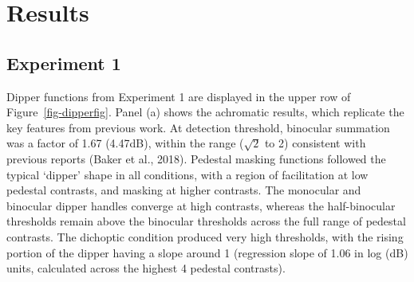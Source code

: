 \documentclass[
  letterpaper,
  DIV=11,
  numbers=noendperiod]{scrartcl}
\begin{document}
\section{Results}\label{results}

\subsection{Experiment 1}\label{experiment-1}

Dipper functions from Experiment 1 are displayed in the upper row of
Figure~\ref{fig-dipperfig}. Panel (a) shows the achromatic results,
which replicate the key features from previous work. At detection
threshold, binocular summation was a factor of 1.67 (4.47dB), within the
range (\(\sqrt{2}\) to 2) consistent with previous reports (Baker et
al., 2018). Pedestal masking functions followed the typical `dipper'
shape in all conditions, with a region of facilitation at low pedestal
contrasts, and masking at higher contrasts. The monocular and binocular
dipper handles converge at high contrasts, whereas the half-binocular
thresholds remain above the binocular thresholds across the full range
of pedestal contrasts. The dichoptic condition produced very high
thresholds, with the rising portion of the dipper having a slope around
1 (regression slope of 1.06 in log (dB) units, calculated across the
highest 4 pedestal contrasts).
\end{document}
